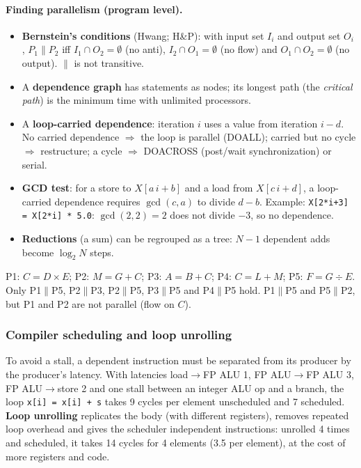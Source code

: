 \paragraph{Finding parallelism (program level).}
\begin{itemize}
  \item \textbf{Bernstein's conditions} (Hwang; \beyond{} H\&P): with input set $I_i$
  and output set $O_i$, $P_1\parallel P_2$ iff $I_1\cap O_2=\emptyset$ (no anti),
  $I_2\cap O_1=\emptyset$ (no flow) and $O_1\cap O_2=\emptyset$ (no output).
  $\parallel$ is not transitive.
  \item A \textbf{dependence graph} has statements as nodes; its longest path (the
  \emph{critical path}) is the minimum time with unlimited processors.
  \item A \textbf{loop-carried dependence}: iteration $i$ uses a value from iteration
  $i-d$. No carried dependence $\Rightarrow$ the loop is parallel (DOALL); carried but
  no cycle $\Rightarrow$ restructure; a cycle $\Rightarrow$ DOACROSS
  (post/wait synchronization) or serial.
  \item \textbf{GCD test}: for a store to $X[a\,i+b]$ and a load from $X[c\,i+d]$, a
  loop-carried dependence requires $\gcd(c,a)$ to divide $d-b$. Example:
  \texttt{X[2*i+3] = X[2*i] * 5.0}: $\gcd(2,2)=2$ does not divide $-3$, so no
  dependence.
  \item \textbf{Reductions} (a sum) can be regrouped as a tree: $N-1$ dependent adds
  become $\log_2N$ steps.
\end{itemize}

\begin{eg}
P1: $C=D\times E$; P2: $M=G+C$; P3: $A=B+C$; P4: $C=L+M$; P5: $F=G\div E$. Only
P1$\parallel$P5, P2$\parallel$P3, P2$\parallel$P5, P3$\parallel$P5 and P4$\parallel$P5
hold. P1$\parallel$P5 and P5$\parallel$P2, but P1 and P2 are not parallel (flow on $C$).
\end{eg}

\subsubsection{Compiler scheduling and loop unrolling}
To avoid a stall, a dependent instruction must be separated from its producer by
the producer's latency. With latencies load$\to$FP ALU 1, FP ALU$\to$FP ALU 3, FP
ALU$\to$store 2 and one stall between an integer ALU op and a branch, the loop
\texttt{x[i] = x[i] + s} takes 9 cycles per element unscheduled and 7 scheduled.
\textbf{Loop unrolling} replicates the body (with different registers), removes
repeated loop overhead and gives the scheduler independent instructions: unrolled 4
times and scheduled, it takes 14 cycles for 4 elements (3.5 per element), at the
cost of more registers and code.

